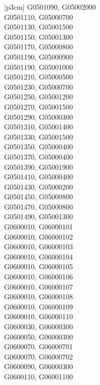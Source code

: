 \begin{customLongTable}{ |p{3cm}| }
G0501090, G05002000 \\ \hline
G0501110, G05000700 \\ \hline
G0501130, G05001500 \\ \hline
G0501150, G05001300 \\ \hline
G0501170, G05000800 \\ \hline
G0501190, G05000900 \\ \hline
G0501190, G05001000 \\ \hline
G0501210, G05000500 \\ \hline
G0501230, G05000700 \\ \hline
G0501250, G05001200 \\ \hline
G0501270, G05001500 \\ \hline
G0501290, G05000300 \\ \hline
G0501310, G05001400 \\ \hline
G0501330, G05001500 \\ \hline
G0501350, G05000400 \\ \hline
G0501370, G05000400 \\ \hline
G0501390, G05001900 \\ \hline
G0501410, G05000400 \\ \hline
G0501430, G05000200 \\ \hline
G0501450, G05000800 \\ \hline
G0501470, G05000800 \\ \hline
G0501490, G05001300 \\ \hline
G0600010, G06000101 \\ \hline
G0600010, G06000102 \\ \hline
G0600010, G06000103 \\ \hline
G0600010, G06000104 \\ \hline
G0600010, G06000105 \\ \hline
G0600010, G06000106 \\ \hline
G0600010, G06000107 \\ \hline
G0600010, G06000108 \\ \hline
G0600010, G06000109 \\ \hline
G0600010, G06000110 \\ \hline
G0600030, G06000300 \\ \hline
G0600050, G06000300 \\ \hline
G0600070, G06000701 \\ \hline
G0600070, G06000702 \\ \hline
G0600090, G06000300 \\ \hline
G0600110, G06001100 \\ \hline

\end{customLongTable}

